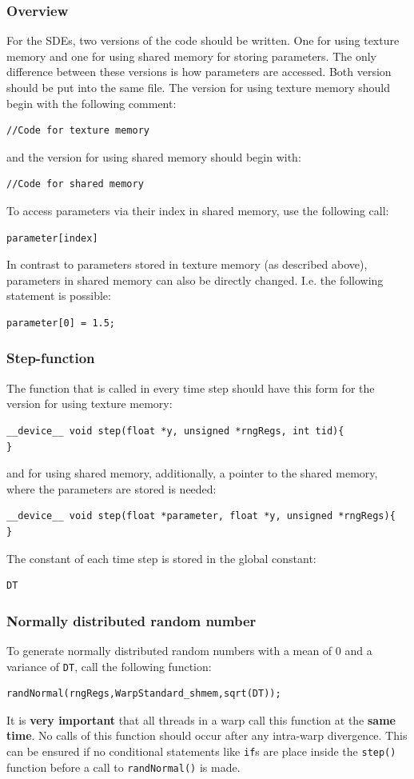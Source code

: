 \documentclass [11pt, a4paper, openany, twoside=off] {article}
\begin{document}
\subsubsection{Overview}
For the SDEs, two versions of the code should be written. One for using texture memory and one for using shared memory for storing parameters. The only difference between these versions is how parameters are accessed. Both version should be put into the same file. The version for using texture memory should begin with the following comment:
\begin{verbatim}
//Code for texture memory
\end{verbatim}
and the version for using shared memory should begin with:
\begin{verbatim}
//Code for shared memory
\end{verbatim}
To access parameters via their index in shared memory, use the following call:
\begin{verbatim}
parameter[index]
\end{verbatim}
In contrast to parameters stored in texture memory (as described above), parameters in shared memory can also be directly changed. I.e. the following statement is possible:
\begin{verbatim}
parameter[0] = 1.5;
\end{verbatim}

\subsubsection{Step-function}
The function that is called in every time step should have this form for the version for using texture memory:
\begin{verbatim}
__device__ void step(float *y, unsigned *rngRegs, int tid){
}
\end{verbatim}
and for using shared memory, additionally, a pointer to the shared memory, where the parameters are stored is needed:
\begin{verbatim}
__device__ void step(float *parameter, float *y, unsigned *rngRegs){
}
\end{verbatim}
The constant of each time step is stored in the global constant:
\begin{verbatim}
DT
\end{verbatim}

\subsubsection{Normally distributed random number}
To generate normally distributed random numbers with a mean of 0 and a variance of \verb$DT$, call the following function:
\begin{verbatim}
randNormal(rngRegs,WarpStandard_shmem,sqrt(DT));
\end{verbatim}
It is \textbf{very important} that all threads in a warp call this function at the \textbf{same time}. No calls of this function should occur after any intra-warp divergence. This can be ensured if no conditional statements like \verb$if$s are place inside the \verb$step()$ function before a call to \verb$randNormal()$ is made.
\end{document}
